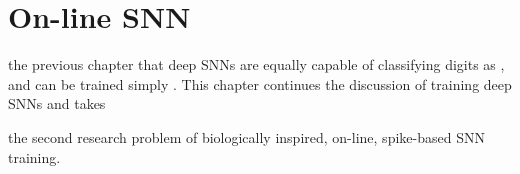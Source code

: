 \DIFdelbegin %
\DIFdelend \DIFaddbegin \chapter[On-line SNN training with SRM]{\DIFaddend On-line SNN \DIFdelbegin {}\DIFdelend \DIFaddbegin {}\DIFaddend }
\label{cha:sdlm}
\DIFdelbegin {}\DIFdelend \DIFaddbegin {}\DIFaddend the previous chapter \DIFaddbegin {}\DIFaddend that deep SNNs are equally capable of classifying digits as \DIFdelbegin {}\DIFdelend \DIFaddbegin {}\DIFaddend , and can be trained simply \DIFdelbegin {}\DIFdelend \DIFaddbegin {}\DIFaddend .
This chapter continues the discussion of training deep SNNs and takes \DIFdelbegin {}\DIFdelend \DIFaddbegin {}


\DIFaddend the second research problem of biologically inspired, on-line, spike-based SNN training.

